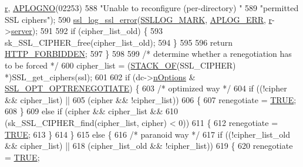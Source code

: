 \begin{DoxyCode}
{      \hyperlink{group__APACHE__CORE__CONFIG_ga091cdd45984e865a888a4f8bb8fe107a}{r}, \hyperlink{group__APACHE__CORE__LOG_ga1dee8a07e06bc5b3de8b89662c2cd666}{APLOGNO}(02253)
588                           \textcolor{stringliteral}{"Unable to reconfigure (per-directory) "}
589                           \textcolor{stringliteral}{"permitted SSL ciphers"});
590             \hyperlink{group__MOD__SSL__PRIVATE_ga9a4071d17f72df0574d3c8840886d3bb}{ssl\_log\_ssl\_error}(\hyperlink{group__MOD__SSL__PRIVATE_ga0e50481cba5952ce59ad2c103f8128a4}{SSLLOG\_MARK}, \hyperlink{group__APACHE__CORE__LOG_ga57ad94ed8c92c4306de90479251a5d58}{APLOG\_ERR}, 
      \hyperlink{group__APACHE__CORE__CONFIG_ga091cdd45984e865a888a4f8bb8fe107a}{r}->\hyperlink{structrequest__rec_a4a8059930ce9409cb885fdeef6921b7b}{server});
591 
592             \textcolor{keywordflow}{if} (cipher\_list\_old) \{
593                 sk\_SSL\_CIPHER\_free(cipher\_list\_old);
594             \}
595 
596             \textcolor{keywordflow}{return} \hyperlink{group__HTTP__Status_ga92646f876056a1e5013e0050496dc04d}{HTTP\_FORBIDDEN};
597         \}
598 
599         \textcolor{comment}{/* determine whether a renegotiation has to be forced */}
600         cipher\_list = (\hyperlink{ssl__engine__init_8c_a8d3ef5dbf93a046b44c0a610b5325b45}{STACK\_OF}(SSL\_CIPHER) *)SSL\_get\_ciphers(ssl);
601 
602         \textcolor{keywordflow}{if} (dc->\hyperlink{structSSLDirConfigRec_a50695711c7c4fca0eddbb421e8620b61}{nOptions} & \hyperlink{group__MOD__SSL__PRIVATE_ga1deca31e6a3457860ece6b8ca3c8343e}{SSL\_OPT\_OPTRENEGOTIATE}) \{
603             \textcolor{comment}{/* optimized way */}
604             \textcolor{keywordflow}{if} ((!cipher && cipher\_list) ||
605                 (cipher && !cipher\_list))
606             \{
607                 renegotiate = \hyperlink{group__MOD__SSL__PRIVATE_gaa8cecfc5c5c054d2875c03e77b7be15d}{TRUE};
608             \}
609             \textcolor{keywordflow}{else} \textcolor{keywordflow}{if} (cipher && cipher\_list &&
610                      (sk\_SSL\_CIPHER\_find(cipher\_list, cipher) < 0))
611             \{
612                 renegotiate = \hyperlink{group__MOD__SSL__PRIVATE_gaa8cecfc5c5c054d2875c03e77b7be15d}{TRUE};
613             \}
614         \}
615         \textcolor{keywordflow}{else} \{
616             \textcolor{comment}{/* paranoid way */}
617             \textcolor{keywordflow}{if} ((!cipher\_list\_old && cipher\_list) ||
618                 (cipher\_list\_old && !cipher\_list))
619             \{
620                 renegotiate = \hyperlink{group__MOD__SSL__PRIVATE_gaa8cecfc5c5c054d2875c03e77b7be15d}{TRUE};
}
\end{DoxyCode}
